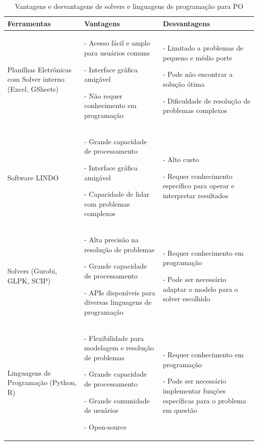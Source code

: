 \documentclass{article}
\begin{document}
\begin{table}[H]
\centering
\caption{Vantagens e desvantagens de solvers e linguagens de programação para PO}
\label{tab:vantagens-desvantagens}
\begin{tabular}{|p{4cm}|p{4cm}|p{4cm}|}
\hline
\textbf{Ferramentas} & \textbf{Vantagens} & \textbf{Desvantagens} \\ \hline
Planilhas Eletrônicas com Solver interno (Excel, GSheets) & - Acesso fácil e amplo para usuários comuns \par - Interface gráfica amigável \par - Não requer conhecimento em programação & - Limitado a problemas de pequeno e médio porte \par - Pode não encontrar a solução ótima \par - Dificuldade de resolução de problemas complexos \\ \hline
Software LINDO & - Grande capacidade de processamento \par - Interface gráfica amigável \par - Capacidade de lidar com problemas complexos & - Alto custo \par - Requer conhecimento específico para operar e interpretar resultados \\ \hline
Solvers (Gurobi, GLPK, SCIP) & - Alta precisão na resolução de problemas \par - Grande capacidade de processamento \par - APIs disponíveis para diversas linguagens de programação & - Requer conhecimento em programação \par - Pode ser necessário adaptar o modelo para o solver escolhido \\ \hline
Linguagens de Programação (Python, R) & - Flexibilidade para modelagem e resolução de problemas \par - Grande capacidade de processamento \par - Grande comunidade de usuários \par - Open-source & - Requer conhecimento em programação \par - Pode ser necessário implementar funções específicas para o problema em questão \\ \hline
\end{tabular}
\end{table}
\end{document}
